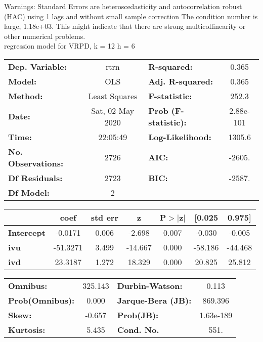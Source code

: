 Warnings: \newline
 [1] Standard Errors are heteroscedasticity and autocorrelation robust (HAC) using 1 lags and without small sample correction \newline
 [2] The condition number is large, 1.18e+03. This might indicate that there are \newline
 strong multicollinearity or other numerical problems.\\ 

regression model for VRPD, k = 12 h = 6\begin{center}
\begin{tabular}{lclc}
\toprule
\textbf{Dep. Variable:}    &       rtrn       & \textbf{  R-squared:         } &     0.365   \\
\textbf{Model:}            &       OLS        & \textbf{  Adj. R-squared:    } &     0.365   \\
\textbf{Method:}           &  Least Squares   & \textbf{  F-statistic:       } &     252.3   \\
\textbf{Date:}             & Sat, 02 May 2020 & \textbf{  Prob (F-statistic):} & 2.88e-101   \\
\textbf{Time:}             &     22:05:49     & \textbf{  Log-Likelihood:    } &    1305.6   \\
\textbf{No. Observations:} &        2726      & \textbf{  AIC:               } &    -2605.   \\
\textbf{Df Residuals:}     &        2723      & \textbf{  BIC:               } &    -2587.   \\
\textbf{Df Model:}         &           2      & \textbf{                     } &             \\
\bottomrule
\end{tabular}
\begin{tabular}{lcccccc}
                   & \textbf{coef} & \textbf{std err} & \textbf{z} & \textbf{P$> |$z$|$} & \textbf{[0.025} & \textbf{0.975]}  \\
\midrule
\textbf{Intercept} &      -0.0171  &        0.006     &    -2.698  &         0.007        &       -0.030    &       -0.005     \\
\textbf{ivu}       &     -51.3271  &        3.499     &   -14.667  &         0.000        &      -58.186    &      -44.468     \\
\textbf{ivd}       &      23.3187  &        1.272     &    18.329  &         0.000        &       20.825    &       25.812     \\
\bottomrule
\end{tabular}
\begin{tabular}{lclc}
\textbf{Omnibus:}       & 325.143 & \textbf{  Durbin-Watson:     } &     0.113  \\
\textbf{Prob(Omnibus):} &   0.000 & \textbf{  Jarque-Bera (JB):  } &   869.396  \\
\textbf{Skew:}          &  -0.657 & \textbf{  Prob(JB):          } & 1.63e-189  \\
\textbf{Kurtosis:}      &   5.435 & \textbf{  Cond. No.          } &      551.  \\
\bottomrule
\end{tabular}
\end{center}


